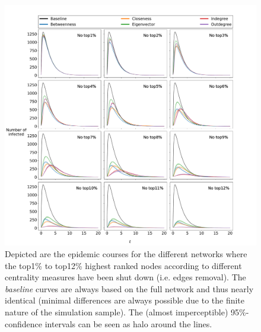 \documentclass{Template resources/netsci-project}
\begin{document}
\begin{figure}[!ht]
    \centering
    \includegraphics[width=\linewidth]{Figures/epidemic_course.pdf}
    \caption{Depicted are the epidemic courses for the different networks where the top1\% to top12\% highest ranked nodes according to different centrality measures have been shut down (i.e. edges removal). The \textit{baseline} curves are always based on the full network and thus nearly identical (minimal differences are always possible due to the finite nature of the simulation sample). The (almost imperceptible) 95\%-confidence intervals can be seen as halo around the lines.}
    \label{fig:epidemic_course}
\end{figure}
\end{document}
